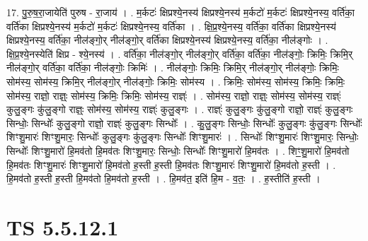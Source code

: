 \documentclass[17pt]{extarticle}
\begin{document}
17. पु॒रु॒ष॒रा॒जायेति॑ पुरुष - रा॒जाय॑ । . म॒र्कटः॑ क्षिप्रश्ये॒नस्य॑ क्षिप्रश्ये॒नस्य॑ म॒र्कटो॑ म॒र्कटः॑ क्षिप्रश्ये॒नस्य॒ वर्ति॑का॒ वर्ति॑का क्षिप्रश्ये॒नस्य॑ म॒र्कटो॑ म॒र्कटः॑ क्षिप्रश्ये॒नस्य॒ वर्ति॑का । . क्षि॒प्र॒श्ये॒नस्य॒ वर्ति॑का॒ वर्ति॑का क्षिप्रश्ये॒नस्य॑ क्षिप्रश्ये॒नस्य॒ वर्ति॑का॒ नील॑ङ्गो॒र् नील॑ङ्गो॒र् वर्ति॑का क्षिप्रश्ये॒नस्य॑ क्षिप्रश्ये॒नस्य॒ वर्ति॑का॒ नील॑ङ्गोः । . क्षि॒प्र॒श्ये॒नस्येति॑ क्षिप्र - श्ये॒नस्य॑ । . वर्ति॑का॒ नील॑ङ्गो॒र् नील॑ङ्गो॒र् वर्ति॑का॒ वर्ति॑का॒ नील॑ङ्गोः॒ क्रिमिः॒ क्रिमि॒र् नील॑ङ्गो॒र् वर्ति॑का॒ वर्ति॑का॒ नील॑ङ्गोः॒ क्रिमिः॑ । . नील॑ङ्गोः॒ क्रिमिः॒ क्रिमि॒र् नील॑ङ्गो॒र् नील॑ङ्गोः॒ क्रिमिः॒ सोम॑स्य॒ सोम॑स्य॒ क्रिमि॒र् नील॑ङ्गो॒र् नील॑ङ्गोः॒ क्रिमिः॒ सोम॑स्य । . क्रिमिः॒ सोम॑स्य॒ सोम॑स्य॒ क्रिमिः॒ क्रिमिः॒ सोम॑स्य॒ राज्ञो॒ राज्ञ्ः॒ सोम॑स्य॒ क्रिमिः॒ क्रिमिः॒ सोम॑स्य॒ राज्ञ्ः॑ । . सोम॑स्य॒ राज्ञो॒ राज्ञ्ः॒ सोम॑स्य॒ सोम॑स्य॒ राज्ञ्ः॑ कुलु॒ङ्गः कु॑लु॒ङ्गो राज्ञ्ः॒ सोम॑स्य॒ सोम॑स्य॒ राज्ञ्ः॑ कुलु॒ङ्गः । . राज्ञ्ः॑ कुलु॒ङ्गः कु॑लु॒ङ्गो राज्ञो॒ राज्ञ्ः॑ कुलु॒ङ्गः सिन्धोः॒ सिन्धोः᳚ कुलु॒ङ्गो राज्ञो॒ राज्ञ्ः॑ कुलु॒ङ्गः सिन्धोः᳚ । . कु॒लु॒ङ्गः सिन्धोः॒ सिन्धोः᳚ कुलु॒ङ्गः कु॑लु॒ङ्गः सिन्धोः᳚ शिꣳशु॒मारः॑ शिꣳशु॒मारः॒ सिन्धोः᳚ कुलु॒ङ्गः कु॑लु॒ङ्गः सिन्धोः᳚ शिꣳशु॒मारः॑ । . सिन्धोः᳚ शिꣳशु॒मारः॑ शिꣳशु॒मारः॒ सिन्धोः॒ सिन्धोः᳚ शिꣳशु॒मारो॑ हि॒मव॑तो हि॒मव॑तः शिꣳशु॒मारः॒ सिन्धोः॒ सिन्धोः᳚ शिꣳशु॒मारो॑ हि॒मव॑तः । . शिꣳ॒॒शु॒मारो॑ हि॒मव॑तो हि॒मव॑तः शिꣳशु॒मारः॑ शिꣳशु॒मारो॑ हि॒मव॑तो ह॒स्ती ह॒स्ती हि॒मव॑तः शिꣳशु॒मारः॑ शिꣳशु॒मारो॑ हि॒मव॑तो ह॒स्ती । . हि॒मव॑तो ह॒स्ती ह॒स्ती हि॒मव॑तो हि॒मव॑तो ह॒स्ती । . हि॒मव॑त॒ इति॑ हि॒म - व॒तः॒ । . ह॒स्तीति॑ ह॒स्ती । \newline
\pagebreak
{}

\section{ TS 5.5.12.1 }
\end{document}
